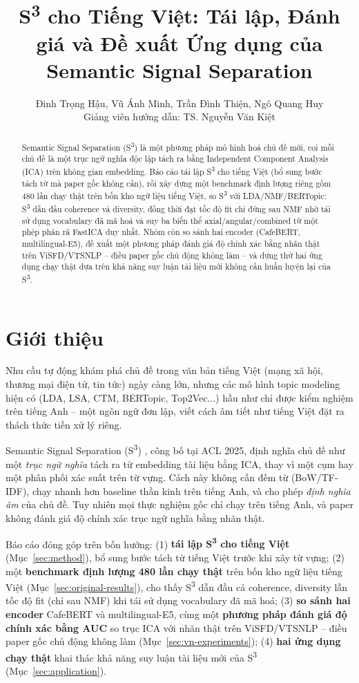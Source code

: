 \documentclass[11pt]{article}
\title{S\textsuperscript{3} cho Tiếng Việt: Tái lập, Đánh giá và Đề xuất Ứng dụng của Semantic Signal Separation}
\author{
  Đinh Trọng Hậu, Vũ Ánh Minh, Trần Đình Thiện, Ngô Quang Huy \\
  Giảng viên hướng dẫn: TS. Nguyễn Văn Kiệt
}
\begin{document}
\maketitle

\begin{abstract}
Semantic Signal Separation (S\textsuperscript{3}) là một phương pháp mô
hình hoá chủ đề mới, coi mỗi chủ đề là một trục ngữ nghĩa độc lập tách ra
bằng Independent Component Analysis (ICA) trên không gian embedding. Báo
cáo tái lập S\textsuperscript{3} cho tiếng Việt (bổ sung bước tách từ mà
paper gốc không cần), rồi xây dựng một benchmark định lượng riêng gồm 480
lần chạy thật trên bốn kho ngữ liệu tiếng Việt, so S\textsuperscript{3}
với LDA/NMF/BERTopic: S\textsuperscript{3} dẫn đầu coherence và diversity,
đồng thời đạt tốc độ fit chỉ đứng sau NMF nhờ tái sử dụng vocabulary đã
mã hoá và suy ba biến thể axial/angular/combined từ một phép phân rã
FastICA duy nhất. Nhóm còn so sánh hai encoder
(CafeBERT, multilingual-E5), đề xuất một phương pháp đánh giá độ chính xác
bằng nhãn thật trên ViSFD/VTSNLP -- điều paper gốc chủ động không làm --
và dựng thử hai ứng dụng chạy thật dựa trên khả năng suy luận tài liệu mới
không cần huấn luyện lại của S\textsuperscript{3}.
\end{abstract}

\section{Giới thiệu}
\label{sec:intro}

Nhu cầu tự động khám phá chủ đề trong văn bản tiếng Việt (mạng xã hội,
thương mại điện tử, tin tức) ngày càng lớn, nhưng các mô hình topic
modeling hiện có (LDA, LSA, CTM, BERTopic, Top2Vec...) hầu như chỉ được
kiểm nghiệm trên tiếng Anh -- một ngôn ngữ đơn lập, viết cách âm tiết như
tiếng Việt đặt ra thách thức tiền xử lý riêng.

Semantic Signal Separation (S\textsuperscript{3}) \citep{kardos2025s3},
công bố tại ACL 2025, định nghĩa chủ đề như một \emph{trục ngữ nghĩa} tách
ra từ embedding tài liệu bằng ICA, thay vì một cụm hay một phân phối xác
suất trên từ vựng. Cách này không cần đếm từ (BoW/TF-IDF), chạy nhanh hơn
baseline thần kinh trên tiếng Anh, và cho phép \emph{định nghĩa âm} của
chủ đề. Tuy nhiên mọi thực nghiệm gốc chỉ chạy trên tiếng Anh, và paper
không đánh giá độ chính xác trục ngữ nghĩa bằng nhãn thật.

Báo cáo đóng góp trên bốn hướng: (1) \textbf{tái lập S\textsuperscript{3}
cho tiếng Việt} (Mục~\ref{sec:method}), bổ sung bước tách từ tiếng Việt
trước khi xây từ vựng; (2) một \textbf{benchmark định lượng 480 lần chạy
thật} trên bốn kho ngữ liệu tiếng Việt (Mục~\ref{sec:original-results}),
cho thấy S\textsuperscript{3} dẫn đầu cả coherence, diversity lẫn tốc độ
fit (chỉ sau NMF) khi tái sử dụng vocabulary đã mã hoá; (3) \textbf{so
sánh hai encoder} CafeBERT
và multilingual-E5, cùng một \textbf{phương pháp đánh giá độ chính xác
bằng AUC} so trục ICA với nhãn thật trên ViSFD/VTSNLP -- điều paper gốc
chủ động không làm (Mục~\ref{sec:vn-experiments}); (4) \textbf{hai ứng
dụng chạy thật} khai thác khả năng suy luận tài liệu mới của
S\textsuperscript{3} (Mục~\ref{sec:application}).
\end{document}
